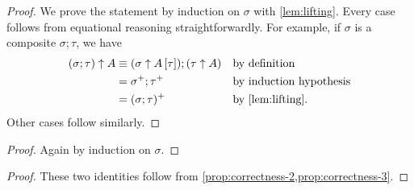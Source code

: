 \documentclass[a4paper,UKenglish,numberwithinsect,cleveref,thm-restate]{lipics-v2021}
\begin{document}
\propCorrectnessTwo*
\begin{proof}
  We prove the statement by induction on $\sigma$ with \cref{lem:lifting}.
  Every case follows from equational reasoning straightforwardly.
  For example, if $\sigma$ is a composite $\sigma;\tau$, we have
  \begin{align*}
    (\sigma;\tau) \uparrow A & \judgeq (\sigma \uparrow \sub{A}{\tau});(\tau \uparrow A) && \text{by definition} \\
                             & = \sigma^+;\tau^+                                     && \text{by induction hypothesis} \\ 
                             & = (\sigma;\tau)^+                                     && \text{by \cref{lem:lifting}.} 
  \end{align*}
  Other cases follow similarly.
\end{proof}

\propCorrectnessThree*
\begin{proof}
  Again by induction on $\sigma$.
\end{proof}

\propCoherenceUparrow*
\begin{proof}
  These two identities follow from \cref{prop:correctness-2,prop:correctness-3}.
\end{proof}
\end{document}
